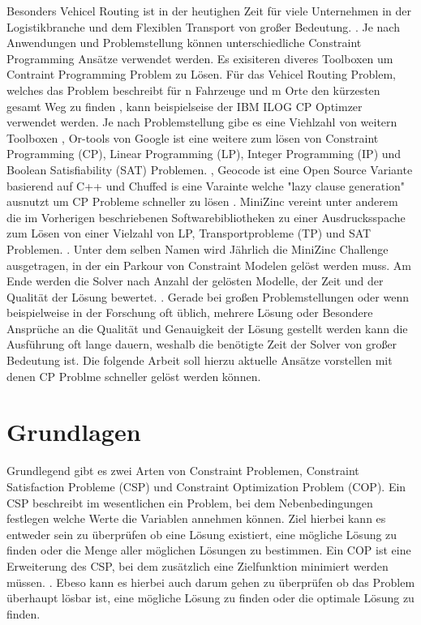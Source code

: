 Besonders Vehicel Routing ist in der heutighen Zeit für viele Unternehmen in der
Logistikbranche und dem Flexiblen Transport von großer Bedeutung.
\cite[1]{delec22jo}. Je nach Anwendungen und Problemstellung können
unterschiedliche Constraint Programming Ansätze verwendet werden. Es exisiteren
diveres Toolboxen um Contraint Programming Problem zu Lösen. Für das Vehicel
Routing Problem, welches das Problem beschreibt für n Fahrzeuge und m Orte den
kürzesten gesamt Weg zu finden \cite[222]{labor18jo}, kann beispielseise der IBM
ILOG CP Optimzer verwendet werden.\cite{IBMIwe} Je nach Problemstellung gibe es
eine Viehlzahl von weitern Toolboxen \cite{Solviwea}, Or-tools von Google ist
eine weitere zum lösen von Constraint Programming (CP), Linear Programming (LP),
Integer Programming (IP) und Boolean Satisfiability (SAT) Problemen.
\cite{ORToowe}, Geocode ist eine Open Source Variante basierend auf C++
\cite{GECODwe} und Chuffed is eine Varainte welche "lazy clause generation"
ausnutzt um CP Probleme schneller zu lösen \cite{Chuff24co}. MiniZinc vereint
unter anderem die im Vorherigen beschriebenen Softwarebibliotheken zu einer
Ausdrucksspache zum Lösen von einer Vielzahl von LP, Transportprobleme (TP) und
SAT Problemen. \cite{MiniZwe}. Unter dem selben Namen wird Jährlich die MiniZinc
Challenge ausgetragen, in der ein Parkour von Constraint Modelen gelöst werden
muss. Am Ende werden die Solver nach Anzahl der gelösten Modelle, der Zeit und
der Qualität der Lösung bewertet. \cite{Homewe}. Gerade bei großen
Problemstellungen oder wenn beispielweise in der Forschung oft üblich, mehrere
Lösung oder Besondere Ansprüche an die Qualität und Genauigkeit der Lösung
gestellt werden kann die Ausführung oft lange dauern, weshalb die benötigte Zeit
der Solver von großer Bedeutung ist. Die folgende Arbeit soll hierzu aktuelle
Ansätze vorstellen mit denen CP Problme schneller gelöst werden können. 


\section{Grundlagen}
\label{sec:Grundlagen}
Grundlegend gibt es zwei Arten von Constraint Problemen, Constraint Satisfaction
Probleme (CSP) und Constraint Optimization Problem (COP). Ein CSP beschreibt im
wesentlichen ein Problem, bei dem Nebenbedingungen festlegen welche Werte die
Variablen annehmen können. \cite[13]{rossi06bo} Ziel hierbei kann es entweder
sein zu überprüfen ob eine Lösung existiert, eine mögliche Lösung zu finden oder
die Menge aller möglichen Lösungen zu bestimmen. Ein COP ist eine Erweiterung
des CSP, bei dem zusätzlich eine Zielfunktion minimiert werden müssen.
\cite[171]{rossi06bo}. Ebeso kann es hierbei auch darum gehen zu überprüfen ob
das Problem überhaupt lösbar ist, eine mögliche Lösung zu finden oder die
optimale Lösung zu finden.


